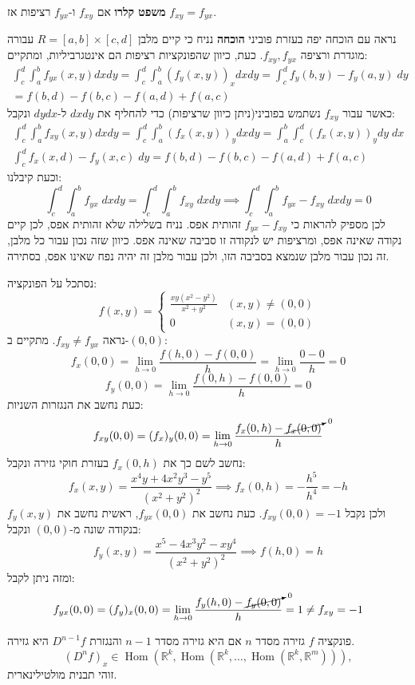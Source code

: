 \documentclass{tstextbook}
\begin{document}
\textbf{משפט קלרו}
אם \(f_{xy}\) ו-\(f_{yx}\) רציפות אז \(f_{xy}=f_{yx}\).

נראה עם הוכחה יפה בעזרת פוביני
\textbf{הוכחה}
נניח כי קיים מלבן \(R=[a,b]\times[c,d]\) עבורה מוגדרת ורציפה \(f_{xy},f_{yx}\). כעת, כיוון שהפונקציות רציפות הם אינטגרביליות, ומתקיים:
\begin{gather*}\int_c^d \!\!\!\int_{a}^b f_{yx}(x,y)dxdy=\int_{c}^d \!\!\!\int_{a}^b(f_{y}(x,y))_{x}dxdy=\int_{c}^d f_{y}(b,y)-f_{y}(a,y)\;dy \\=f(b,d)-f(b,c)-f(a,d)+f(a,c)  
\end{gather*}
כאשר עבור \(f_{xy}\) נשתמש בפוביני(ניתן כיוון שרציפות) כדי להחליף את \(dxdy\) ל-\(dydx\) ונקבל:
\begin{gather*}\int_c^d \!\!\!\int_{a}^b f_{xy}(x,y)dxdy=\int_{c}^d \!\!\!\int_{a}^b(f_{x}(x,y))_{y}dxdy= \int_{a}^b \int_{c}^d (f_{x}(x,y))_{y} dy\;dx\\\int_{c}^d f_{x}(x,d)-f_{y}(x,c)\;dy=f(b,d)-f(b,c)-f(a,d)+f(a,c)
\end{gather*}
וכעת קיבלנו:
$$\int_c^d \!\!\!\int_{a}^b \!\!f_{yx}\;dxdy=\int_c^d \!\!\!\int_{a}^b \!\!f_{xy}\;dxdy\implies \int_c^d \!\!\!\int_{a}^b \!f_{yx}-f_{xy}\;dxdy=0$$
לכן מספיק להראות כי \(f_{yx}-f_{xy}\) זהותית אפס. נניח בשלילה שלא זהותית אפס, לכן קיים נקודה שאינה אפס, ומרציפות יש לנקודה זו סביבה שאינה אפס. כיוון שזה נכון עבור כל מלבן, זה נכון עבור מלבן שנמצא בסביבה הזו, ולכן עבור מלבן זה יהיה נפח שאינו אפס, בסתירה.

\begin{example}
נסתכל על הפונקציה:
$$f(x,y)=\begin{cases}\frac{xy(x^2-y^2)}{x^2+y^2} & (x,y)\neq(0,0) \\0 & (x,y)=(0,0)
\end{cases}$$
נראה \(f_{xy}\neq f_{yx}\). מתקיים ב-\((0,0)\):
$$f_{x}(0,0)=\lim_{ h \to 0 } \frac{f(h,0)-f(0,0)}{h}=\lim_{ h \to 0 } \frac{0-0}{h}=0$$$$f_{y}(0,0)=\lim_{ h \to 0 } \frac{f(0,h)-f(0,0)}{h}=0$$
כעת נחשב את הנגזרות השניות:
$$f_{xy}(0,0)=(f_{x})_{y}(0,0)=\lim_{ h \to 0 } \frac{f_{x}(0,h)-\cancelto{ 0 }{ f_{x}(0,0) }}{h}$$
נחשב לשם כך את \(f_{x}(0,h)\) בעזרת חוקי גזירה ונקבל:
$$f_{x}(x,y)= \frac{x^4y+4x^2y^3-y^5}{(x^2+y^2)^2}\implies f_{x}(0,h)=-\frac{h^5}{h^4}=-h$$
ולכן נקבל \(f_{xy}(0,0)=-1\). כעת נחשב את \(f_{yx}(0,0)\), ראשית נחשב את \(f_{y}(x,y)\) בנקודה שונה מ-\((0,0)\) ונקבל:
$$f_{y}(x,y)= \frac{x^5-4x^3y^2-xy^4}{(x^2+y^2)^2}\implies f(h,0)=h$$
ומזה ניתן לקבל:
$$f_{yx}(0,0)=(f_{y})_{x}(0,0)=\lim_{ h \to 0 } \frac{f_{y}(h,0)-\cancelto{ 0 }{ f_{y}(0,0) }}{h}=1\neq f_{xy}=-1$$

\end{example}
\begin{definition}
פונקציה \(f\) גזירה מסדר \(n\) אם היא גזירה מסדר \(n-1\) והנגזרת \(D^{n-1}f\) היא גזירה. $$(D^{n}f)_{x}\in\operatorname{Hom}(\mathbb{R}^{k},\operatorname{Hom}(\mathbb{R}^{k},\dots,\operatorname{Hom}(\mathbb{R}^{k},\mathbb{R}^{m}))),$$
זוהי תבנית מולטילינארית.

\end{definition}
\end{document}
